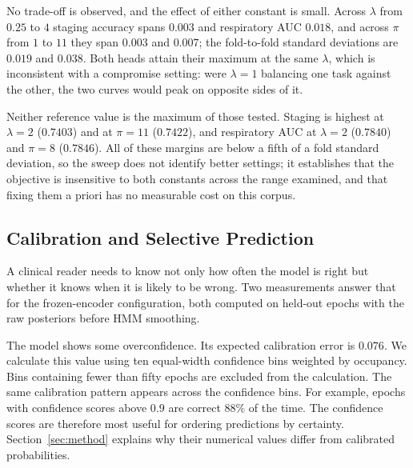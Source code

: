 \documentclass{ieeeaccess}
\begin{document}
No trade-off is observed, and the effect of either constant is small. Across $\lambda$ from
$0.25$ to $4$
staging accuracy spans $0.003$ and respiratory AUC $0.018$, and across $\pi$ from $1$ to $11$
they span $0.003$ and $0.007$; the fold-to-fold standard deviations are $0.019$ and $0.038$.
Both heads attain their maximum at the same $\lambda$, which is inconsistent with a
compromise setting: were $\lambda=1$ balancing one task against the other, the two curves
would peak on opposite sides of it.

Neither reference value is the maximum of those tested. Staging is highest at $\lambda=2$
($0.7403$) and at $\pi=11$ ($0.7422$), and respiratory AUC at $\lambda=2$ ($0.7840$) and
$\pi=8$ ($0.7846$). All of these margins are below a fifth of a fold standard deviation, so
the sweep does not identify better settings; it establishes that the objective is insensitive
to both constants across the range examined, and that fixing them a priori has no measurable
cost on this corpus.

\subsection{Calibration and Selective Prediction}
A clinical reader needs to know not only how often the model is right but whether it knows when
it is likely to be wrong. Two measurements answer that for the frozen-encoder configuration,
both computed on held-out epochs with the raw posteriors before HMM smoothing.


The model shows some overconfidence. Its expected calibration error is $0.076$. We calculate this value using ten equal-width confidence bins weighted by occupancy. Bins containing fewer than fifty epochs are excluded from the calculation. The same calibration pattern appears across the confidence bins. For example, epochs with confidence scores above $0.9$ are correct $88\%$ of the time. The confidence scores are therefore most useful for ordering predictions by certainty. Section~\ref{sec:method} explains why their numerical values differ from calibrated probabilities.
\end{document}
